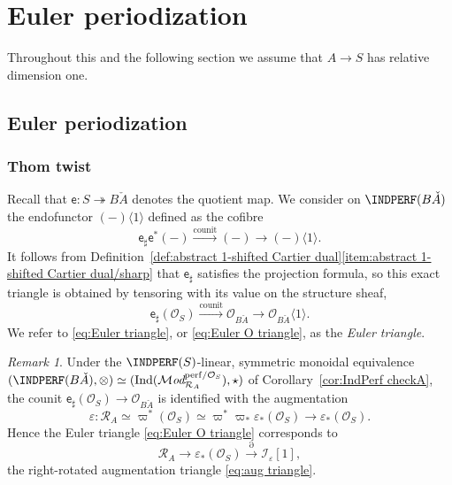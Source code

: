 \documentclass[12pt, oneside]{amsart}
\numberwithin{equation}{section}
\theoremstyle{remark}
\newtheorem{remark}[subsubsection]{Remark}
\theoremstyle{plain}
\newcommand{\MOD}{\mathcal{M}\textit{od}}
\newcommand{\R}{\mathcal{R}}
\newcommand{\RA}{\R_A}
\newcommand{\OO}{\mathcal{O}}
\newcommand{\Ind}{\operatorname{Ind}}
\newcommand{\Thom}[1]{\langle #1 \rangle}
\newcommand{\eps}{\varepsilon}
\newcommand{\sfe}{\mathsf{e}}
\begin{document}
\section{Euler periodization}\label{sec:Euler}

Throughout this and the following section we assume that $A \to S$ has relative dimension one.

\subsection{Euler periodization}\label{ssec:Euler}

\subsubsection{Thom twist}\label{sssec:Thom}

Recall that $\sfe : S \twoheadrightarrow B\check{A}$ denotes the quotient map.
We consider on $\INDPERF(B\check{A})$ the endofunctor $(-)\Thom{1}$ defined as the cofibre
\begin{equation}\label{eq:Euler triangle}
  \sfe_\sharp \sfe^*(-)
  \xrightarrow{\mathrm{counit}} (-)
  \to (-)\Thom{1}.
\end{equation}
It follows from Definition~\ref{def:abstract 1-shifted Cartier dual}\ref{item:abstract 1-shifted Cartier dual/sharp} that $\sfe_\sharp$ satisfies the projection formula, so this exact triangle is obtained by tensoring with its value on the structure sheaf,
\begin{equation}\label{eq:Euler O triangle}
	\sfe_\sharp (\OO_S) \xrightarrow{\mathrm{counit}} \OO_{B\check{A}} \to \OO_{B\check{A}}\Thom{1}.
\end{equation}
We refer to \eqref{eq:Euler triangle}, or \eqref{eq:Euler O triangle}, as the \emph{Euler triangle}.

\begin{remark}\label{rem:Euler = rotated aug triangle}
  Under the $\INDPERF(S)$-linear, symmetric monoidal equivalence $(\INDPERF(B\check{A}), \otimes) \simeq (\Ind(\MOD_{\RA}^{\mathrm{perf}/\OO_S}), \star)$ of Corollary~\ref{cor:IndPerf checkA}, the counit $\sfe_\sharp(\OO_S) \to \OO_{B\check{A}}$ is identified with the augmentation
	$$ \eps : \RA \simeq \varpi^*(\OO_S) \simeq \varpi^*\varpi_*\eps_*(\OO_S) \to \eps_*(\OO_S). $$
	Hence the Euler triangle \eqref{eq:Euler O triangle} corresponds to
	\[
	  \RA
		\to \eps_*(\OO_S)
		\xrightarrow{\partial} \mathcal{I}_\eps[1],
	\]
	the right-rotated augmentation triangle \eqref{eq:aug triangle}.
\end{remark}
\end{document}
